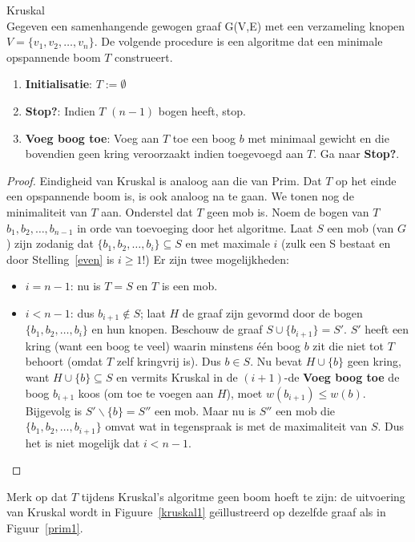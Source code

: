 \newpage
\begin{algo} Kruskal \label{kruskal}\\
  Gegeven een samenhangende gewogen graaf G(V,E) met een verzameling
  knopen $V =
  \{v_{1},v_{2},\ldots,v_{n}\}$.  De volgende procedure is een algoritme
  dat een minimale opspannende boom $T$ construeert.
\begin{enumerate}
\item \textbf{Initialisatie}: $T := \emptyset$
\item \textbf{Stop?}: Indien $T$ $(n-1)$ bogen heeft, stop.
\item \textbf{Voeg boog toe}: Voeg aan $T$ toe een boog $b$ met minimaal
  gewicht en die bovendien geen kring veroorzaakt indien toegevoegd
  aan $T$. 
  Ga naar {\bf Stop?}.
\end{enumerate}
\end{algo}
\begin{proof}
Eindigheid van Kruskal is analoog aan die van Prim.
Dat $T$ op het einde een opspannende boom is, is ook analoog na te gaan.
We tonen nog de minimaliteit van $T$ aan.
%
Onderstel dat $T$ geen mob is.
Noem de bogen van $T$ $b_{1},b_{2},\ldots ,b_{n-1}$ in orde van toevoeging
door het algoritme.
Laat $S$ een mob (van $G$) zijn zodanig dat $\{b_{1}, b_{2}, \ldots ,
b_{i}\} \subseteq S$ en met maximale $i$ (zulk een S bestaat en door
Stelling~\ref{even} is $i \geq 1$!) Er zijn twee mogelijkheden:
\begin{itemize}
\item
\textbf{$i = n-1$}: nu is $T = S$ en $T$ is een mob.
\item
\textbf{$i < n-1$}: dus $b_{i+1} \notin S$; laat $H$ de graaf zijn
gevormd door de bogen $\{b_{1}, b_{2}, \ldots , b_{i}\}$ en hun
knopen. Beschouw de graaf $S \cup \{b_{i+1}\} = S'$. $S'$ heeft een
kring (want een boog te veel) waarin minstens \'{e}\'{e}n boog $b$ zit
die niet tot $T$ behoort (omdat $T$ zelf kringvrij is). Dus $b \in
S$. Nu bevat $H \cup \{b\}$ geen kring, want $H \cup \{b\} \subseteq
S$ en vermits Kruskal in de $(i+1)$-de \textbf{Voeg boog toe} de boog
$b_{i+1}$ koos (om toe te voegen aan $H$), moet $w(b_{i+1}) \leq
w(b)$. Bijgevolg is $S' \backslash \{b\} = S''$ een mob. Maar nu is $S''$
een mob die $\{b_{1}, b_{2}, \ldots , b_{i+1}\}$ omvat wat in
tegenspraak is met de maximaliteit van $S$. Dus het is niet mogelijk
dat $i < n-1$.
\end{itemize}
\end{proof}

Merk op dat $T$ tijdens Kruskal's algoritme geen boom hoeft te zijn: de
uitvoering van Kruskal wordt in Figuure~\ref{kruskal1}
ge\"{\i}llustreerd op dezelfde graaf als in Figuur~\ref{prim1}.


